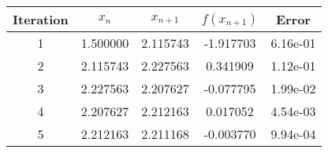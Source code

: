 \begin{tabular}{|c|c|c|c|c|}
\hline
Iteration & $x_n$ & $x_{n+1}$ & $f(x_{n+1})$ & Error \\
\hline
1 & 1.500000 & 2.115743 & -1.917703 & 6.16e-01 \\
\hline
2 & 2.115743 & 2.227563 & 0.341909 & 1.12e-01 \\
\hline
3 & 2.227563 & 2.207627 & -0.077795 & 1.99e-02 \\
\hline
4 & 2.207627 & 2.212163 & 0.017052 & 4.54e-03 \\
\hline
5 & 2.212163 & 2.211168 & -0.003770 & 9.94e-04 \\
\hline
\end{tabular}